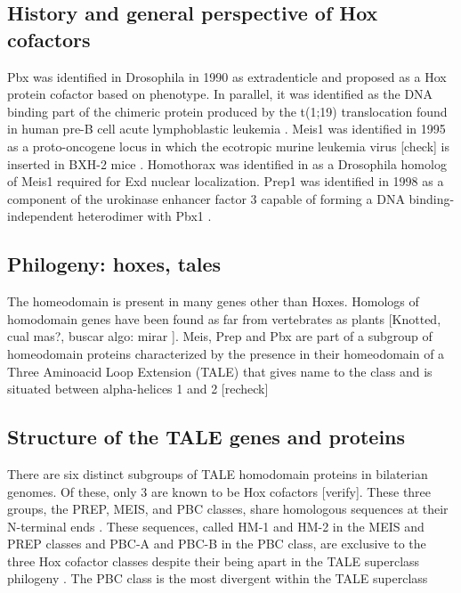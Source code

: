 \subsection{History and general perspective of Hox cofactors}

Pbx was identified in Drosophila in 1990 as extradenticle \cite{Peifer1990} and proposed as a Hox protein cofactor based on phenotype. In parallel, it was identified as the DNA binding part of the chimeric protein produced by the t(1;19) translocation found in human pre-B cell acute lymphoblastic leukemia \cite{Kamps1990}. 
Meis1 was identified in 1995 as a proto-oncogene locus in which the ecotropic murine leukemia virus [check] is inserted in BXH-2 mice \cite{Moskow1995}. Homothorax was identified in \cite{Rauskolb1995,Rieckhof1997} as a Drosophila homolog of Meis1 required for Exd nuclear localization. 
Prep1 was identified in 1998 as a component of the urokinase enhancer factor 3 capable of forming a DNA binding-independent heterodimer with Pbx1 \cite{Berthelsen1998}.

\subsection{Philogeny: hoxes, tales}
The homeodomain is present in many genes other than Hoxes. Homologs of homodomain genes have been found as far from vertebrates as plants [Knotted, cual mas?, buscar algo: mirar \cite{Burglin1997}]. Meis, Prep and Pbx are part of a subgroup of homeodomain proteins characterized by the presence in their homeodomain of a Three Aminoacid Loop Extension (TALE) that gives name to the class and is situated between alpha-helices 1 and 2 [recheck] \cite{Burglin1997, Mukherjee2007, Moens2006}

\subsection{Structure of the TALE genes and proteins}
	
		There are six distinct subgroups of TALE homodomain proteins in bilaterian genomes. Of these, only 3 are known to be Hox cofactors [verify]. These three groups, the PREP, MEIS, and PBC classes, share homologous sequences at their N-terminal ends \cite{Burglin1998}. These sequences, called HM-1 and HM-2 in the MEIS and PREP classes and PBC-A and PBC-B in the PBC class, are exclusive to the three Hox cofactor classes despite their being apart in the TALE superclass philogeny \cite{Mukherjee2007}.
		The PBC class is the most divergent within the TALE superclass

